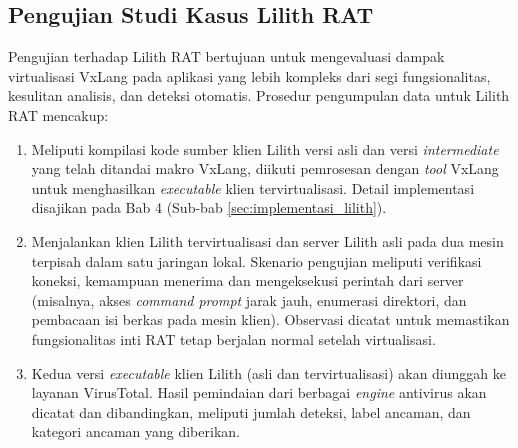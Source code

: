 \subsection{Pengujian Studi Kasus Lilith RAT}
\label{subsec:prosedur_lilith_rat}
Pengujian terhadap Lilith RAT bertujuan untuk mengevaluasi dampak virtualisasi VxLang pada aplikasi yang lebih kompleks dari segi fungsionalitas, kesulitan analisis, dan deteksi otomatis. Prosedur pengumpulan data untuk Lilith RAT mencakup:
\begin{enumerate}
    \item {} Meliputi kompilasi kode sumber klien Lilith versi asli dan versi \textit{intermediate} yang telah ditandai makro VxLang, diikuti pemrosesan dengan \textit{tool} VxLang untuk menghasilkan \textit{executable} klien tervirtualisasi. Detail implementasi disajikan pada Bab 4 (Sub-bab \ref{sec:implementasi_lilith}).
    \item {} Menjalankan klien Lilith tervirtualisasi dan server Lilith asli pada dua mesin terpisah dalam satu jaringan lokal. Skenario pengujian meliputi verifikasi koneksi, kemampuan menerima dan mengeksekusi perintah dari server (misalnya, akses \textit{command prompt} jarak jauh, enumerasi direktori, dan pembacaan isi berkas pada mesin klien). Observasi dicatat untuk memastikan fungsionalitas inti RAT tetap berjalan normal setelah virtualisasi.
    \item {} Kedua versi \textit{executable} klien Lilith (asli dan tervirtualisasi) akan diunggah ke layanan VirusTotal. Hasil pemindaian dari berbagai \textit{engine} antivirus akan dicatat dan dibandingkan, meliputi jumlah deteksi, label ancaman, dan kategori ancaman yang diberikan.
\end{enumerate}

